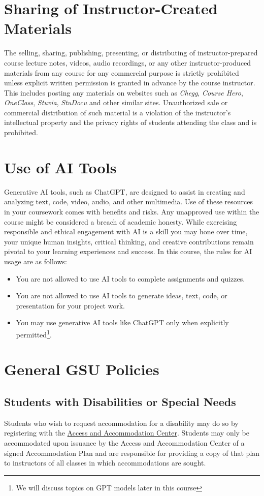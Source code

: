 \documentclass[a4paper, 12pt]{article}
\begin{document}
\section{Sharing of Instructor-Created Materials}
The selling, sharing, publishing, presenting, or distributing of instructor-prepared course lecture notes, videos, audio recordings, or any other instructor-produced materials from any course for any commercial purpose is strictly prohibited unless explicit written permission is granted in advance by the course instructor. This includes posting any materials on websites such as \textit{Chegg}, \textit{Course Hero}, \textit{OneClass}, \textit{Stuvia}, \textit{StuDocu} and other similar sites. Unauthorized sale or commercial distribution of such material is a violation of the instructor’s intellectual property and the privacy rights of students attending the class and is prohibited.

\section{Use of AI Tools}
Generative AI tools, such as ChatGPT, are designed to assist in creating and analyzing text, code, video, audio, and other multimedia. Use of these resources in your coursework comes with benefits and risks. Any unapproved use within the course might be considered a breach of academic honesty. While exercising responsible and ethical engagement with AI is a skill you may hone over time, your unique human insights, critical thinking, and creative contributions remain pivotal to your learning experiences and success. In this course, the rules for AI usage are as follows:
\begin{itemize}
  \item You are not allowed to use AI tools to complete assignments and quizzes.
  \item You are not allowed to use AI tools to generate ideas, text, code, or presentation for your project work.
  \item You may use generative AI tools like ChatGPT only when explicitly permitted\footnote{We will discuss topics on GPT models later in this course}.
\end{itemize}

\section{General GSU Policies}
\subsection{Students with Disabilities or Special Needs}
Students who wish to request accommodation for a disability may do so by registering with the \href{https://access.gsu.edu/}{Access and Accommodation Center}. Students may only be accommodated upon issuance by the Access and Accommodation Center of a signed Accommodation Plan and are responsible for providing a copy of that plan to instructors of all classes in which accommodations are sought.
\end{document}
